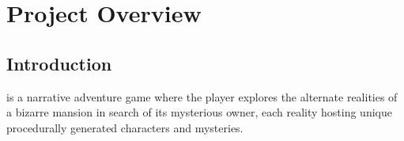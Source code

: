 \chapter{Project Overview}
\section{Introduction}

\ourgame{} is a narrative adventure game where the player explores the alternate realities of a bizarre mansion in search of its mysterious owner, each reality hosting unique procedurally generated characters and mysteries.





